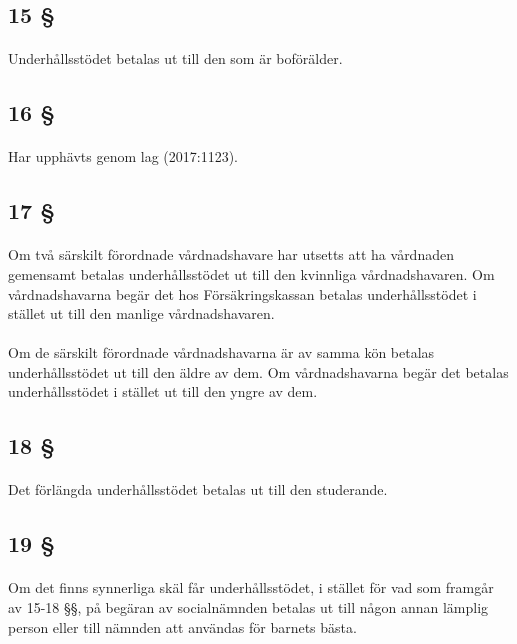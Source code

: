 \documentclass[a4paper,notitlepage,openany,10pt]{book}
\begin{document}
\subsection*{15 §}
\paragraph*{}
Underhållsstödet betalas ut till den som är boförälder.
\subsection*{16 §}
\paragraph*{}
Har upphävts genom
lag (2017:1123).
\subsection*{17 §}
\paragraph*{}
Om två särskilt förordnade vårdnadshavare har utsetts att ha vårdnaden gemensamt betalas underhållsstödet ut till den kvinnliga vårdnadshavaren. Om vårdnadshavarna begär det hos Försäkringskassan betalas underhållsstödet i stället ut till den manlige vårdnadshavaren.
\paragraph*{}
Om de särskilt förordnade vårdnadshavarna är av samma kön betalas underhållsstödet ut till den äldre av dem. Om vårdnadshavarna begär det betalas underhållsstödet i stället ut till den yngre av dem.
\subsection*{18 §}
\paragraph*{}
Det förlängda underhållsstödet betalas ut till den studerande.
\subsection*{19 §}
\paragraph*{}
Om det finns synnerliga skäl får underhållsstödet, i stället för vad som framgår av 15-18 §§, på begäran av socialnämnden betalas ut till någon annan lämplig person eller till nämnden att användas för barnets bästa.
\end{document}
